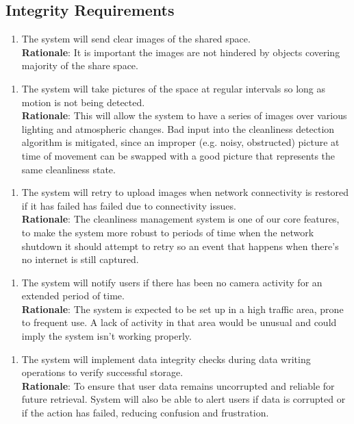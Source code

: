 \documentclass{article}
\begin{document}
\subsection{Integrity Requirements}
\begin{enumerate}[{IR}1. ]
    \item The system will send clear images of the shared space.\\
    \textbf{Rationale}: It is important the images are not hindered by objects covering majority of the share space. 
\end{enumerate}
\begin{enumerate}[{IR}2. ]
    \item The system will take pictures of the space at regular intervals so long as motion is not being detected.\\
    \textbf{Rationale}: This will allow the system to have a series of images over various lighting and atmospheric changes. Bad input into the cleanliness detection algorithm is mitigated, since an improper (e.g. noisy, obstructed) picture at time of movement can be swapped with a good picture that represents the same cleanliness state.
\end{enumerate}  
\begin{enumerate}[{IR}3. ]
    \item The system will retry to upload images when network connectivity is restored if it has failed has failed due to connectivity issues.\\
    \textbf{Rationale}: The cleanliness management system is one of our core features, to make the system more robust to periods of time when the network shutdown it should attempt to retry so an event that happens when there's no internet is still captured. 
\end{enumerate} 
\begin{enumerate}[{IR}4. ]
    \item The system will notify users if there has been no camera activity for an extended period of time.\\
    \textbf{Rationale}: The system is expected to be set up in a high traffic area, prone to frequent use. A lack of activity in that area would be unusual and could imply the system isn't working properly.
\end{enumerate}
\begin{enumerate}[{IR}5. ]
    \item The system will implement data integrity checks during data writing operations to verify successful storage.\\
    \textbf{Rationale}:  To ensure that user data remains uncorrupted and reliable for future retrieval. System will also be able to alert users if data is corrupted or if the action has failed, reducing confusion and frustration.
\end{enumerate} 
\end{document}
